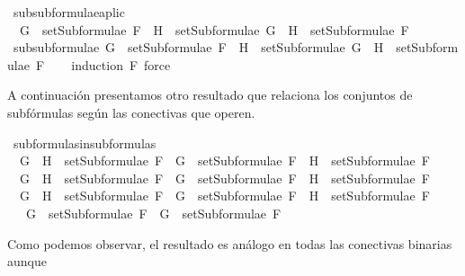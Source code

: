 \begin{isabellebody}
\isanewline
{}\isamarkupfalse%
\ subsubformulae{\isacharunderscore}aplic{\isacharcolon}\ \isanewline
\ \ {\isachardoublequoteopen}G\ {\isasymin}\ setSubformulae\ F\ {\isasymLongrightarrow}\ H\ {\isasymin}\ setSubformulae\ G\ {\isasymLongrightarrow}\ H\ {\isasymin}\ setSubformulae\ F{\isachardoublequoteclose}\isanewline
%
\isadelimproof
\ \ %
\endisadelimproof
%
\isatagproof
{}\isamarkupfalse%
%
\endisatagproof
{\isafoldproof}%
%
\isadelimproof
\isanewline
%
\endisadelimproof
\ \ \isanewline
{}\isamarkupfalse%
\ subsubformulae{\isacharcolon}\ {\isachardoublequoteopen}G\ {\isasymin}\ setSubformulae\ F\ {\isasymLongrightarrow}\ H\ {\isasymin}\ setSubformulae\ G\ {\isasymLongrightarrow}\ H\ {\isasymin}\ setSubformulae\ F{\isachardoublequoteclose}\isanewline
%
\isadelimproof
\ \ %
\endisadelimproof
%
\isatagproof
{}\isamarkupfalse%
\ {\isacharparenleft}induction\ F{\isacharsemicolon}\ force{\isacharparenright}%
\endisatagproof
{\isafoldproof}%
%
\isadelimproof
%
\endisadelimproof
%
\begin{isamarkuptext}%
A continuación presentamos otro resultado que relaciona los conjuntos de subfórmulas 
según las conectivas que operen.%
\end{isamarkuptext}\isamarkuptrue%
\isamarkupfalse%
\ subformulas{\isacharunderscore}in{\isacharunderscore}subformulas{\isacharcolon}\isanewline
\ \ {\isachardoublequoteopen}G\ \isactrlbold {\isasymand}\ H\ {\isasymin}\ setSubformulae\ F\ {\isasymLongrightarrow}\ G\ {\isasymin}\ setSubformulae\ F\ {\isasymand}\ H\ {\isasymin}\ setSubformulae\ F{\isachardoublequoteclose}\isanewline
\ \ {\isachardoublequoteopen}G\ \isactrlbold {\isasymor}\ H\ {\isasymin}\ setSubformulae\ F\ {\isasymLongrightarrow}\ G\ {\isasymin}\ setSubformulae\ F\ {\isasymand}\ H\ {\isasymin}\ setSubformulae\ F{\isachardoublequoteclose}\isanewline
\ \ {\isachardoublequoteopen}G\ \isactrlbold {\isasymrightarrow}\ H\ {\isasymin}\ setSubformulae\ F\ {\isasymLongrightarrow}\ G\ {\isasymin}\ setSubformulae\ F\ {\isasymand}\ H\ {\isasymin}\ setSubformulae\ F{\isachardoublequoteclose}\isanewline
\ \ {\isachardoublequoteopen}\isactrlbold {\isasymnot}\ G\ {\isasymin}\ setSubformulae\ F\ {\isasymLongrightarrow}\ G\ {\isasymin}\ setSubformulae\ F{\isachardoublequoteclose}\isanewline
%
\isadelimproof
\ \ %
\endisadelimproof
%
\isatagproof
{}\isamarkupfalse%
%
\endisatagproof
{\isafoldproof}%
%
\isadelimproof
%
\endisadelimproof
%
\begin{isamarkuptext}%
Como podemos observar, el resultado es análogo en todas las conectivas binarias aunque

\end{isamarkuptext}
\end{isabellebody}
